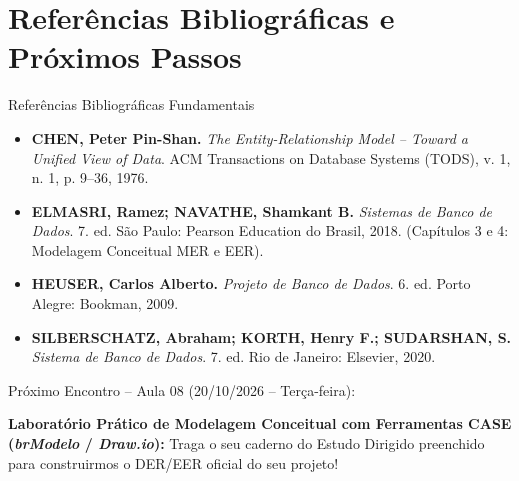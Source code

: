 \section[Referências]{Referências Bibliográficas e Próximos Passos}

\begin{frame}{Referências Bibliográficas Fundamentais}
  \scriptsize
  \begin{itemize}\setlength{\itemsep}{1.5mm}
    \item \textbf{CHEN, Peter Pin-Shan.} \textit{The Entity-Relationship Model -- Toward a Unified View of Data}. ACM Transactions on Database Systems (TODS), v. 1, n. 1, p. 9--36, 1976.
    \item \textbf{ELMASRI, Ramez; NAVATHE, Shamkant B.} \textit{Sistemas de Banco de Dados}. 7. ed. São Paulo: Pearson Education do Brasil, 2018. (Capítulos 3 e 4: Modelagem Conceitual MER e EER).
    \item \textbf{HEUSER, Carlos Alberto.} \textit{Projeto de Banco de Dados}. 6. ed. Porto Alegre: Bookman, 2009.
    \item \textbf{SILBERSCHATZ, Abraham; KORTH, Henry F.; SUDARSHAN, S.} \textit{Sistema de Banco de Dados}. 7. ed. Rio de Janeiro: Elsevier, 2020.
  \end{itemize}
  \vspace{0.15cm}
  \alert{Próximo Encontro -- Aula 08 (20/10/2026 -- Terça-feira):}\par
  \scriptsize
  \textbf{Laboratório Prático de Modelagem Conceitual com Ferramentas CASE (\textit{brModelo} / \textit{Draw.io}):} Traga o seu caderno do Estudo Dirigido preenchido para construirmos o DER/EER oficial do seu projeto!
\end{frame}
